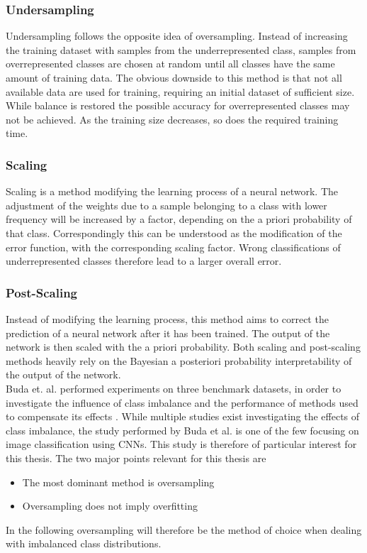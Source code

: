 \subsubsection{Undersampling}
Undersampling follows the opposite idea of oversampling. Instead of increasing the training dataset with samples from the underrepresented class, samples from overrepresented classes are chosen at random until all classes have the same amount of training data. The obvious downside to this method is that not all available data are used for training, requiring an initial dataset of sufficient size. While balance is restored the possible accuracy for overrepresented classes may not be achieved. As the training size decreases, so does the required training time. \\

\subsubsection{Scaling}
Scaling is a method modifying the learning process of a neural network. The adjustment of the weights due to a sample belonging to a class with lower frequency will be increased by a factor, depending on the a priori probability of that class. Correspondingly this can be understood as the modification of the error function, with the corresponding scaling factor. Wrong classifications of underrepresented classes therefore lead to a larger overall error. 

\subsubsection{Post-Scaling}
Instead of modifying the learning process, this method aims to correct the prediction of a neural network after it has been trained. The output of the network is then scaled with the a priori probability. Both scaling and post-scaling methods heavily rely on the Bayesian a posteriori probability interpretability of the output of the network.\\


Buda et. al. performed experiments on three benchmark datasets, in order to investigate the influence of class imbalance and the performance of methods used to compensate its effects \cite{Buda2017}. While multiple studies exist investigating the effects of class imbalance, the study performed by Buda et al. is one of the few focusing on image classification using CNNs. This study is therefore of particular interest for this thesis. The two major points relevant for this thesis are 
\begin{itemize}
\item The most dominant method is oversampling
\item Oversampling does not imply overfitting
\end{itemize}
In the following oversampling will therefore be the method of choice when dealing with imbalanced class distributions.

